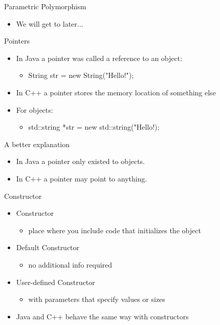 \documentclass{beamer}
\begin{document}
\begin{frame}{Parametric Polymorphism}
\begin{itemize}
\item We will get to later...
\end{itemize}
\end{frame}

\begin{frame}{Pointers}
\begin{itemize}
\item In Java a pointer was called a reference to an object:
\begin{itemize}
\item String str = new String("Hello!");
\end{itemize}
\item In C++ a pointer stores the memory location of something else
\item For objects:
\begin{itemize}
\item std::string *str = new std::string("Hello!);
\end{itemize}
\end{itemize}
\end{frame}

\begin{frame}{A better explanation}
\begin{itemize}
\item In Java a pointer only existed to objects.
\item In C++ a pointer may point to anything.
\end{itemize}
\end{frame}

\begin{frame}{Constructor}
\begin{itemize}
\item Constructor
\begin{itemize}
\item place where you include code that initializes the object
\end{itemize}
\item Default Constructor
\begin{itemize}
\item no additional info required
\end{itemize}
\item User-defined Constructor
\begin{itemize}
\item with parameters that specify values or sizes
\end{itemize}
\item Java and C++ behave the same way with constructors
\end{itemize}
\end{frame}
\end{document}
